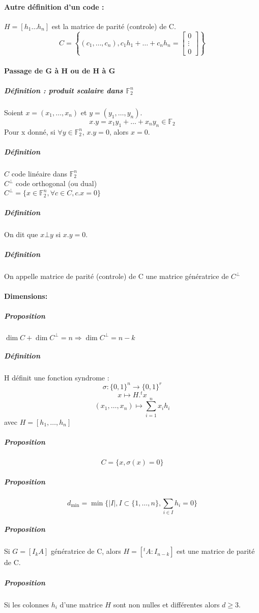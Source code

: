 \documentclass[12pt,a4paper]{report}
\begin{document}
\paragraph{Autre définition d'un code :}
$H=[h_1\ldots h_n]$ est la matrice de parité (controle) de C. $$C=\left\{(c_1,\ldots,c_n),c_1h_1+\ldots+c_nh_n=\left[\begin{array}{l}
0 \\
\vdots \\
0 \end{array} \right] \right\}$$
\paragraph{Passage de G à H ou de H à G}
\subparagraph{Définition : produit scalaire dans $\mathbb{F}_2^n$\\}
Soient $x=(x_1,\ldots,x_n)$ et $y=(y_1,\ldots,y_n)$.
$$ x.y=x_1y_1+\ldots + x_ny_n \in \mathbb{F}_2 $$
Pour x donné, si $\forall y \in \mathbb{F}_2^n$, $x.y=0$, alors $x=0$.
\subparagraph{Définition\\}
$C$ code linéaire dans $\mathbb{F}_2^n$\\
$C^{\bot}$ code orthogonal (ou dual)\\
$ C^{\bot} = \{x \in \mathbb{F}_2^n, \forall c \in C, c.x=0\}$
\subparagraph{Définition\\}
On dit que $x\bot y$ si $x.y=0$.
 \subparagraph{Définition\\}
On appelle matrice de parité (controle) de C une matrice génératrice de $C^{\bot}$
\paragraph{Dimensions:}
\subparagraph{Proposition\\}
$ \dim C + \dim C^{\bot} = n \Rightarrow \dim C^{\bot} = n-k $
\subparagraph{Définition\\}
H définit une fonction syndrome :
$$ \sigma : \{0,1\}^n \rightarrow \{0,1\}^r $$
$$ x \longmapsto H.^tx $$
$$ (x_1,\ldots,x_n) \longmapsto \sum_{i=1}^{n} x_ih_i $$
avec $ H = [h_1,\ldots,h_n] $
\subparagraph{Proposition\\}
$$ C= \{x,\sigma(x) = 0 \} $$
\subparagraph{Proposition\\}
$$d_{ \min} = \min\{|I|,I\subset \{1,\ldots,n\}, \sum_{i\in I} h_i =0 \} $$
\subparagraph{Proposition\\}
Si $G =  [I_k A] $ génératrice de C, alors $ H = [^tA : I_{n-k} ]$ est une matrice de parité de C.
\subparagraph{Proposition\\}
Si les colonnes $h_i$ d'une matrice $H$ sont non nulles et différentes alors $d\geqslant 3$.
\end{document}

